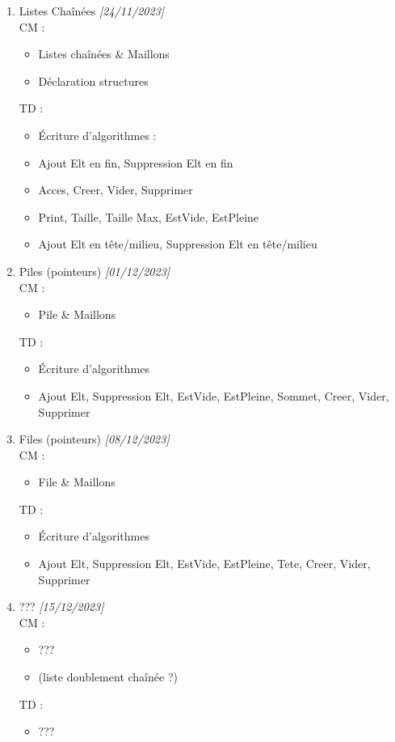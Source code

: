 \documentclass[11pt,a4paper]{article}
\begin{document}
\begin{enumerate}
\item Listes Chaînées \textit{[24/11/2023]}\\
  CM :
  \begin{itemize}
  \item Listes chaînées \& Maillons
  \item Déclaration structures
  \end{itemize}
  TD :
  \begin{itemize}
  \item \'Ecriture d'algorithmes :
  \item Ajout Elt en fin, Suppression Elt en fin
  \item Acces, Creer, Vider, Supprimer
  \item Print, Taille, Taille Max, EstVide, EstPleine
  \item Ajout Elt en tête/milieu, Suppression Elt en tête/milieu
  \end{itemize}

\medskip

\item Piles (pointeurs) \textit{[01/12/2023]}\\
  CM :
  \begin{itemize}
  \item Pile \& Maillons
  \end{itemize}
  TD :
  \begin{itemize}
  \item \'Ecriture d'algorithmes
  \item Ajout Elt, Suppression Elt, EstVide, EstPleine, Sommet, Creer, Vider, Supprimer
  \end{itemize}

\medskip

\item Files (pointeurs) \textit{[08/12/2023]}\\
  CM :
  \begin{itemize}
  \item File \& Maillons
  \end{itemize}
  TD :
  \begin{itemize}
  \item \'Ecriture d'algorithmes
  \item Ajout Elt, Suppression Elt, EstVide, EstPleine, Tete, Creer, Vider, Supprimer
  \end{itemize}

\medskip

\item ??? \textit{[15/12/2023]}\\
  CM :
  \begin{itemize}
  \item ???
  \item (liste doublement chaînée ?)
  \end{itemize}
  TD :
  \begin{itemize}
  \item ???
  \end{itemize}


\end{enumerate}
\end{document}

